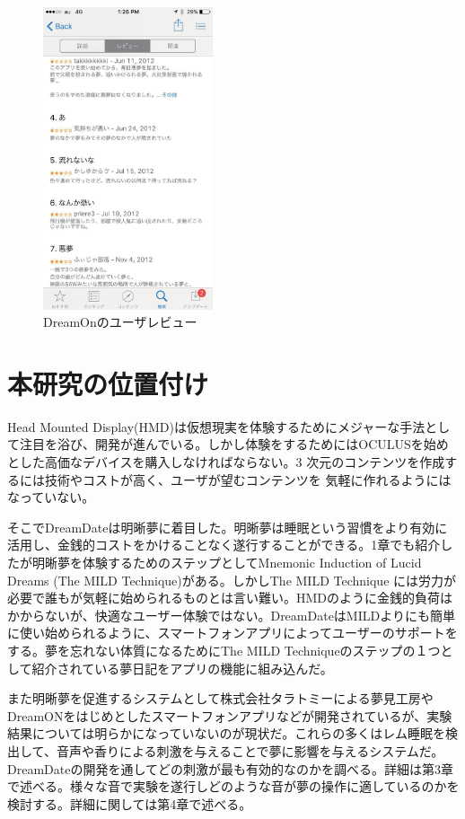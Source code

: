 \begin{figure}[htbp]
\begin{center}
\includegraphics[width=5cm]{eps/dreamOn.eps}
\caption{DreamOnのユーザレビュー}
\label{DreamOnImage}
\end{center}
\end{figure}

\section{本研究の位置付け}
Head Mounted Display(HMD)は仮想現実を体験するためにメジャーな手法として注目を浴び、開発が進んでいる。しかし体験をするためにはOCULUSを始めとした高価なデバイスを購入しなければならない。3 次元のコンテンツを作成するには技術やコストが高く、ユーザが望むコンテンツを 気軽に作れるようにはなっていない。

そこでDreamDateは明晰夢に着目した。明晰夢は睡眠という習慣をより有効に活用し、金銭的コストをかけることなく遂行することができる。1章でも紹介したが明晰夢を体験するためのステップとしてMnemonic Induction of Lucid Dreams (The MILD Technique)がある。しかしThe MILD Technique には労力が必要で誰もが気軽に始められるものとは言い難い。HMDのように金銭的負荷はかからないが、快適なユーザー体験ではない。DreamDateはMILDよりにも簡単に使い始められるように、スマートフォンアプリによってユーザーのサポートをする。夢を忘れない体質になるためにThe MILD Techniqueのステップの１つとして紹介されている夢日記をアプリの機能に組み込んだ。

また明晰夢を促進するシステムとして株式会社タラトミーによる夢見工房やDreamONをはじめとしたスマートフォンアプリなどが開発されているが、実験結果については明らかになっていないのが現状だ。これらの多くはレム睡眠を検出して、音声や香りによる刺激を与えることで夢に影響を与えるシステムだ。DreamDateの開発を通してどの刺激が最も有効的なのかを調べる。詳細は第3章で述べる。様々な音で実験を遂行しどのような音が夢の操作に適しているのかを検討する。詳細に関しては第4章で述べる。

